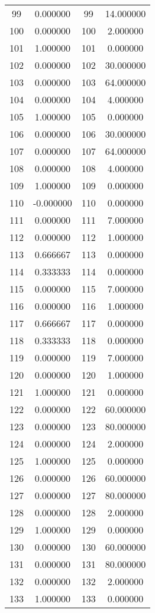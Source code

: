 \documentclass[12pt]{article}
\begin{document}
\begin{longtable}{@{}cccc@{}}
99 & 0.000000 & 99 & 14.000000 \\
100 & 0.000000 & 100 & 2.000000 \\
101 & 1.000000 & 101 & 0.000000 \\
102 & 0.000000 & 102 & 30.000000 \\
103 & 0.000000 & 103 & 64.000000 \\
104 & 0.000000 & 104 & 4.000000 \\
105 & 1.000000 & 105 & 0.000000 \\
106 & 0.000000 & 106 & 30.000000 \\
107 & 0.000000 & 107 & 64.000000 \\
108 & 0.000000 & 108 & 4.000000 \\
109 & 1.000000 & 109 & 0.000000 \\
110 & -0.000000 & 110 & 0.000000 \\
111 & 0.000000 & 111 & 7.000000 \\
112 & 0.000000 & 112 & 1.000000 \\
113 & 0.666667 & 113 & 0.000000 \\
114 & 0.333333 & 114 & 0.000000 \\
115 & 0.000000 & 115 & 7.000000 \\
116 & 0.000000 & 116 & 1.000000 \\
117 & 0.666667 & 117 & 0.000000 \\
118 & 0.333333 & 118 & 0.000000 \\
119 & 0.000000 & 119 & 7.000000 \\
120 & 0.000000 & 120 & 1.000000 \\
121 & 1.000000 & 121 & 0.000000 \\
122 & 0.000000 & 122 & 60.000000 \\
123 & 0.000000 & 123 & 80.000000 \\
124 & 0.000000 & 124 & 2.000000 \\
125 & 1.000000 & 125 & 0.000000 \\
126 & 0.000000 & 126 & 60.000000 \\
127 & 0.000000 & 127 & 80.000000 \\
128 & 0.000000 & 128 & 2.000000 \\
129 & 1.000000 & 129 & 0.000000 \\
130 & 0.000000 & 130 & 60.000000 \\
131 & 0.000000 & 131 & 80.000000 \\
132 & 0.000000 & 132 & 2.000000 \\
133 & 1.000000 & 133 & 0.000000 \\

\end{longtable}
\end{document}
